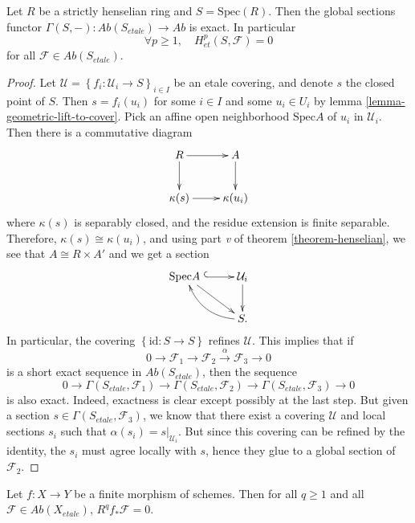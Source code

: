 \begin{lemma}
\label{lemma-vanishing-etale-cohomology-strictly-henselian}
Let $R$ be a strictly henselian ring and $S=\text{Spec}(R)$. Then the global
sections functor $\Gamma(S, -): \textit{Ab}(S_{etale})\to \textit{Ab}$ is 
exact. In
particular
$$
\forall p\geq 1, \quad H_{et}^p(S, \mathcal{F})=0
$$
for all $\mathcal{F}\in \textit{Ab}(S_{etale})$.
\end{lemma}

\begin{proof}
Let $\mathcal{U} = \left\{f_i : \mathcal{U}_i \to S \right\}_{i\in I}$ be an
etale covering, and denote $s$ the closed point of $S$. Then $s = f_i (u_i)$
for some $i\in I$ and some $u_i \in U_i$ by lemma
\ref{lemma-geometric-lift-to-cover}. Pick an affine open neighborhood
$\text{Spec} A$ of $u_i$ in $\mathcal{U}_i$. Then there is a commutative diagram
$$
\xymatrix{
R \ar[r] \ar[d] & A \ar[d] \\
{\kappa(s)} \ar[r] & {\kappa(u_i)}
}
$$
where $\kappa(s)$ is separably closed, and the residue extension is finite
separable. Therefore, $\kappa(s) \cong \kappa(u_i)$, and using part {\it v} of
theorem \ref{theorem-henselian}, we see that $A \cong R\times A'$ and we get a
section
$$
\xymatrix{
{\text{Spec} A\ }\ar[dr] \ar@{^{(}->}[r] & {\mathcal{U}_i} \ar[d]\\
& {S.} \ar@/^1pc/[ul]
}
$$
In particular, the covering $\left\{\text{id} : S\to S\right\}$ refines
$\mathcal{U}$. This implies that if
$$
0 \to \mathcal{F}_1\to \mathcal{F}_2 \xrightarrow{\alpha} \mathcal{F}_3\to 0
$$
is a short exact sequence in $\textit{Ab}(S_{etale})$, then the sequence
$$
0 \to \Gamma(S_{etale}, \mathcal{F}_1) \to \Gamma(S_{etale}, \mathcal{F}_2) \to
\Gamma(S_{etale}, \mathcal{F}_3)\to 0
$$
is also exact. Indeed, exactness is clear except possibly at the last step. But
given a section $s \in \Gamma(S_{etale}, \mathcal{F}_3)$, we know that there 
exist
a covering $\mathcal{U}$ and local sections $s_i$ such that $\alpha (s_i) =
s|_{\mathcal{U}_i}$. But since this covering can be refined by the identity,
the $s_i$ must agree locally with $s$, hence they glue to a global section of
$\mathcal{F}_2$.
\end{proof}

\begin{proposition}
\label{proposition-finite-higher-direct-image-zero}
Let $f: X\to Y$ be a finite morphism of schemes. Then for all $q\geq 1$ and all
$\mathcal{F}\in \textit{Ab}(X_{etale})$, $R^q f_*\mathcal{F}=0$.
\end{proposition}

